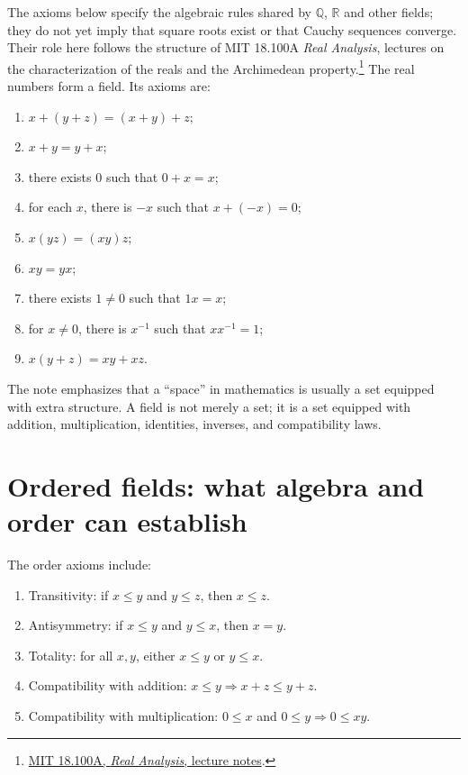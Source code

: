 The axioms below specify the algebraic rules shared by \(\mathbb Q\), \(\mathbb R\) and other fields; they do not yet imply that square roots exist or that Cauchy sequences converge. Their role here follows the structure of MIT 18.100A \emph{Real Analysis}, lectures on the characterization of the reals and the Archimedean property.\footnote{\href{https://ocw.mit.edu/courses/18-100a-real-analysis-fall-2020/pages/lecture-notes-and-readings/}{MIT 18.100A, \emph{Real Analysis}, lecture notes}.} The real numbers form a field. Its axioms are:
\begin{enumerate}[(F1)]
  \item \(x+(y+z)=(x+y)+z\);
  \item \(x+y=y+x\);
  \item there exists \(0\) such that \(0+x=x\);
  \item for each \(x\), there is \(-x\) such that \(x+(-x)=0\);
  \item \(x(yz)=(xy)z\);
  \item \(xy=yx\);
  \item there exists \(1\neq0\) such that \(1x=x\);
  \item for \(x\neq0\), there is \(x^{-1}\) such that \(xx^{-1}=1\);
  \item \(x(y+z)=xy+xz\).
\end{enumerate}

The note emphasizes that a ``space'' in mathematics is usually a set equipped with extra structure.  A field is not merely a set; it is a set equipped with addition, multiplication, identities, inverses, and compatibility laws.

\section{Ordered fields: what algebra and order can establish}

The order axioms include:
\begin{enumerate}[(O1)]
  \item Transitivity: if \(x\le y\) and \(y\le z\), then \(x\le z\).
  \item Antisymmetry: if \(x\le y\) and \(y\le x\), then \(x=y\).
  \item Totality: for all \(x,y\), either \(x\le y\) or \(y\le x\).
  \item Compatibility with addition: \(x\le y\Rightarrow x+z\le y+z\).
  \item Compatibility with multiplication: \(0\le x\) and \(0\le y\Rightarrow0\le xy\).
\end{enumerate}

